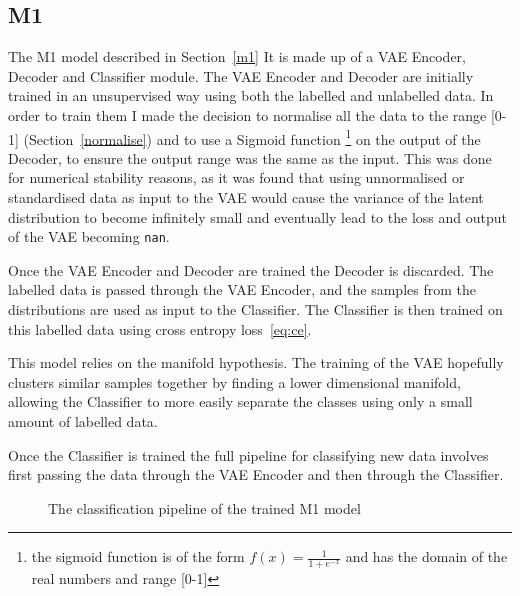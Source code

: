 \subsection{M1}
The M1 model described in Section~\ref{m1} It is made up of a VAE Encoder,
Decoder and Classifier 
module. The VAE Encoder and Decoder are initially trained in an unsupervised way using both the labelled and unlabelled data. In order 
to train them I made the decision to normalise all the data to the range [0-1] (Section~\ref{normalise}) and to use a Sigmoid function 
\footnote{the sigmoid function is of
the form $f(x) = \frac{1}{1+e^{-x}}$ and has the domain of the real numbers and range [0-1]} on the output of the Decoder, to ensure the output range 
was the same as the input. This was done for numerical stability reasons, as it was found that using unnormalised or standardised data 
as input to the VAE would cause the variance of the latent distribution to become infinitely small and eventually lead to the loss and 
output of the VAE becoming \texttt{nan}.

Once the VAE Encoder and Decoder are trained the Decoder is discarded. The labelled data is passed through the VAE Encoder, and the samples
from the distributions are used as input to the Classifier. The Classifier is then trained on this labelled data using cross entropy 
loss~\eqref{eq:ce}. 

This model relies on the manifold hypothesis. The training of the VAE hopefully clusters similar samples together by finding a lower
dimensional manifold, allowing the Classifier to more easily separate the classes using only a small amount of labelled data.

Once the Classifier is trained the full pipeline for classifying new data involves first passing the data 
through the VAE Encoder and then through the Classifier.

\begin{figure}[H]
  \centering
  \caption{The classification pipeline of the trained M1 model}
\end{figure}

